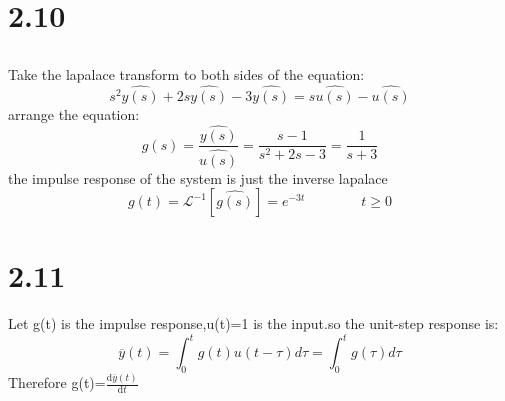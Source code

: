 \documentclass{article}
\newcommand{\rmnum}[1]{\romannumeral #1}
\begin{document}
\section*{2.10}
\subsection*{\rmnum{1}}
Take the lapalace transform to both sides of the equation:
\[s^2\hat{y(s)}+2s\hat{y(s)}-3\hat{y(s)}=s\hat{u(s)}-\hat{u(s)}\]
arrange the equation:
\[g(s)=\frac{\hat{y(s)}}{\hat{u(s)}}=\frac{s-1}{s^2+2s-3}=\frac{1}{s+3}\]
the impulse response of the system is just the inverse lapalace 
\[g(t)= \mathcal{L}^{-1}[\hat{g(s)}]=e^{-3t} \quad\quad\quad\quad t \geq 0\]

\section*{2.11}
Let g(t) is the impulse response,u(t)=1 is the input.so the unit-step response is:
\[\overline{y}(t)=\int_{0}^{t}g(t)u(t-\tau)d\tau=\int_{0}^{t}g(\tau)d\tau\]
Therefore g(t)=$\frac{\mathrm{d}\overline{y}(t)}{\mathrm{d}t}$
\end{document}
